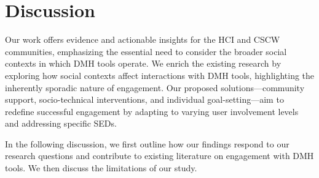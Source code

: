 \section{Discussion}

Our work offers evidence and actionable insights for the HCI and CSCW communities, emphasizing the essential need to consider the broader social contexts in which DMH tools operate.  We enrich the existing research by exploring how social contexts affect interactions with DMH tools, highlighting the inherently sporadic nature of engagement. Our proposed solutions—community support, socio-technical interventions, and individual goal-setting—aim to redefine successful engagement by adapting to varying user involvement levels and addressing specific SEDs.


In the following discussion, we first outline how our findings respond to our research questions and contribute to existing literature on engagement with DMH tools. We then discuss the limitations of our study.


